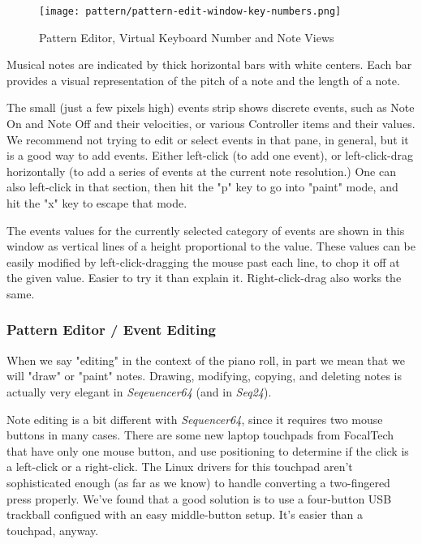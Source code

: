 \begin{figure}[H]
   \centering 
   \texttt{[image: pattern/pattern-edit-window-key-numbers.png]}
   \caption{Pattern Editor, Virtual Keyboard Number and Note Views}
   \label{fig:pattern_editor_key_numbers}
\end{figure}

   Musical notes are indicated by thick horizontal bars with white
   centers.  Each bar provides
   a visual representation of the pitch of a note and the length of a note.

   The small (just a few pixels high) events strip shows discrete events,
   such as Note On and Note Off and their velocities, or various Controller
   items and their values.  We recommend not trying to edit or select events
   in that pane, in general, but it is a good way to add events.
   Either
   left-click (to add one event),
   or left-click-drag horizontally (to add a
   series of events at the current note resolution.)  One can also
   left-click in that section,
   then hit the "p" key to go into "paint" mode,
   and hit the "x" key to escape that mode.

   The events values for the currently selected category of events are shown
   in this window as vertical lines of a height proportional to the value.
   These values can be easily modified by
   left-click-dragging the
   mouse past each line, to chop it off at the given value.  Easier to try
   it than explain it.
   Right-click-drag also works the same.

\subsubsection{Pattern Editor / Event Editing}
\label{subsubsec:seq64_pattern_editor_event_editing}

   When we say "editing" in the context of the piano roll, in part we mean that
   we will "draw" or "paint" notes.
   Drawing, modifying, copying, and deleting
   notes is actually very elegant in \textsl{Seqeuencer64} (and in
   \textsl{Seq24}).

   Note editing is a bit different with \textsl{Sequencer64}, since it
   requires two mouse buttons in many cases.  There are some new
   laptop touchpads from FocalTech that have only one mouse button, and
   use positioning to determine if the click is a left-click or a right-click.
   The Linux drivers for this touchpad aren't sophisticated enough (as far
   as we know) to handle converting a two-fingered press properly.
   We've found that a good solution is to use a four-button USB trackball
   configued with an easy middle-button setup.
   It's easier than a touchpad, anyway.

